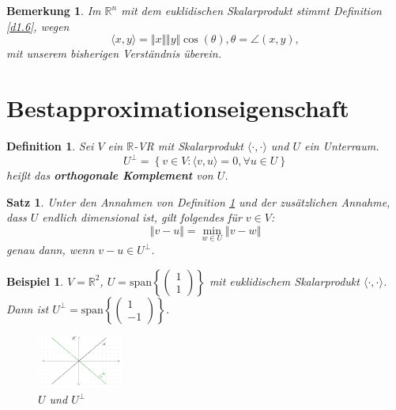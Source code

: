 \documentclass{book}
\newtheorem{theorem}[algorithm]{Satz}
\newtheorem{definition}[algorithm]{Definition}
\newtheorem{remark}[algorithm]{Bemerkung}
\newtheorem{example}[algorithm]{Beispiel}
\def\R{\mathbb{R}}
\begin{document}
            \begin{remark}\label{b1.7}
                Im $\R^n$ mit dem euklidischen Skalarprodukt stimmt Definition \ref*{d1.6}, wegen 
                \begin{equation*}
                    \langle x,y \rangle = \Vert x \Vert \Vert y \Vert \cos(\theta), \theta=\angle(x,y),
                \end{equation*}
                mit unserem bisherigen Verständnis überein.
            \end{remark}
        \section{Bestapproximationseigenschaft}
            \begin{definition}\label{d1.8}
                Sei $V$ ein $\R$-VR mit Skalarprodukt $\langle \cdot,\cdot \rangle$ und $U$ ein Unterraum.
                \begin{equation*}
                    U^\perp = \left \{ v\in V: \langle v,u \rangle=0,\forall u\in U\right\}
                \end{equation*}
                heißt das \textbf{orthogonale Komplement} von $U$.
            \end{definition}
            \begin{theorem}\label{s1.9}
                Unter den Annahmen von Definition \ref*{d1.8} und der  zusätzlichen Annahme, dass $U$ endlich dimensional ist, gilt folgendes für $v\in V$:
                \begin{equation*}
                    \Vert v-u \Vert = \min_{w\in U}\Vert v-w\Vert
                \end{equation*}
                genau dann, wenn $v-u\in U^\perp$.
            \end{theorem}
            \begin{example}\label{b1.10}
                $V=\R^2$, $U=\text{span}\left\{\begin{pmatrix}1\\1\end{pmatrix}\right\}$ mit euklidischem Skalarprodukt $\langle \cdot,\cdot \rangle$.
                Dann ist $U^\perp = \text{span}\left\{\begin{pmatrix}1\\-1\end{pmatrix}\right\}$. 
                \begin{figure}[H]
                    \centering
                    \includegraphics[width=0.25\textwidth]{Bild001}
                    \caption{\(U\) und \(U^\perp\)}
                \end{figure}
            \end{example}
\end{document}
